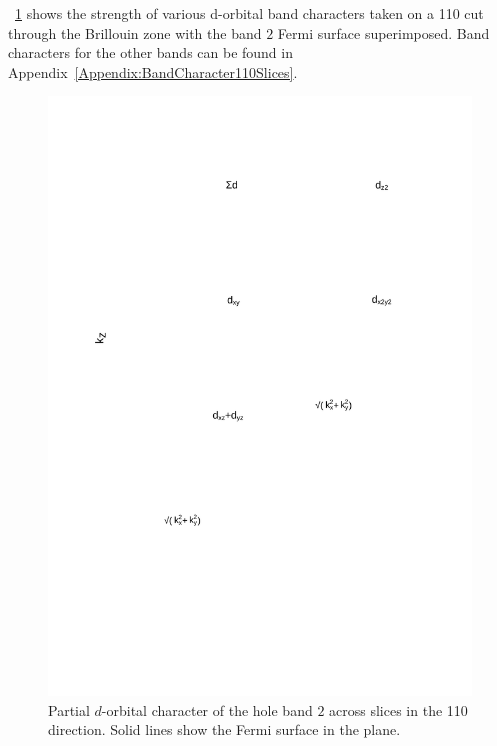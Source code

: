 {{{\Fig~\ref{Fig:3:Band2DCharacter} shows the strength of various d-orbital band characters taken on a 110 cut through the \BaFeP Brillouin zone with the band $2$ Fermi surface superimposed. Band characters for the other bands can be found in Appendix~\ref{Appendix:BandCharacter110Slices}.
\begin{figure}[h!]
    \begin{center}
        \includegraphics[scale=0.7]{Chapter3-dHvABaFe2P2/Figures/AngleDepMeasurements/BandCharacterPlot/Band2_110Slice_BandCharacter}
        \caption{Partial $d$-orbital character of the hole band $2$ across slices in the 110 direction. Solid lines show the Fermi surface in the plane.}
        \label{Fig:3:Band2DCharacter}
    \end{center}
\end{figure}
\begin{figure}[h!]
    \begin{center}

\end{center}
\end{figure}}}}
